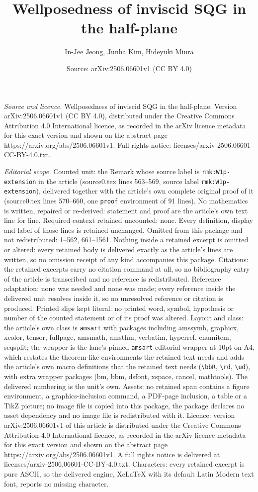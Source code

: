 \documentclass[10pt,a4paper]{amsart}
\title[Wellposedness of inviscid SQG in the half-plane]{Wellposedness of inviscid SQG in the half-plane}
\author{In-Jee Jeong, Junha Kim, Hideyuki Miura}
\date{Source: arXiv:2506.06601v1 (CC BY 4.0)}
\begin{document}
\maketitle

\noindent\emph{Source and licence.} Wellposedness of inviscid SQG in the half-plane. Version arXiv:2506.06601v1 (CC BY 4.0), distributed under the Creative Commons Attribution 4.0 International licence, as recorded in the arXiv licence metadata for this exact version and shown on the abstract page https://arxiv.org/abs/2506.06601v1. Full rights notice: licenses/arxiv-2506.06601-CC-BY-4.0.txt.\par\smallskip

\noindent\textit{Editorial scope.} Counted unit: the Remark whose source label is \texttt{rmk:W1p-extension} in the article (source0.tex lines 563--569, source label \texttt{rmk:W1p-extension}), delivered together with the article's own complete original proof of it (source0.tex lines 570--660, one \texttt{proof} environment of 91 lines). No mathematics is written, repaired or re-derived: statement and proof are the article's own text line for line. Required context retained uncounted: none. Every definition, display and label of those lines is retained unchanged. Omitted from this package and not redistributed: 1--562, 661--1561. Nothing inside a retained excerpt is omitted or altered: every retained body is delivered exactly as the article's lines are written, so no omission receipt of any kind accompanies this package. Citations: the retained excerpts carry no citation command at all, so no bibliography entry of the article is transcribed and no reference is redistributed. Reference adaptation: none was needed and none was made; every reference inside the delivered unit resolves inside it, so no unresolved reference or citation is produced. Printed slips kept literal: no printed word, symbol, hypothesis or number of the counted statement or of its proof was altered. Layout and class: the article's own class is \texttt{amsart} with packages including amssymb, graphicx, xcolor, tensor, fullpage, amsmath, amsthm, verbatim, hyperref, enumitem, seqsplit; the wrapper is the lane's pinned \texttt{amsart} editorial wrapper at 10pt on A4, which restates the theorem-like environments the retained text needs and adds the article's own macro definitions that the retained text needs (\texttt{\textbackslash bbR}, \texttt{\textbackslash rd}, \texttt{\textbackslash ud}), with extra wrapper packages (bm, bbm, dsfont, xspace, cancel, mathtools). The delivered numbering is the unit's own. Assets: no retained span contains a figure environment, a graphics-inclusion command, a PDF-page inclusion, a table or a TikZ picture; no image file is copied into this package, the package declares no asset dependency and no image file is redistributed with it. Licence: version arXiv:2506.06601v1 of this article is distributed under the Creative Commons Attribution 4.0 International licence, as recorded in the arXiv licence metadata for this exact version and shown on the abstract page https://arxiv.org/abs/2506.06601v1. A full rights notice is delivered at licenses/arxiv-2506.06601-CC-BY-4.0.txt. Characters: every retained excerpt is pure ASCII, so the delivered engine, XeLaTeX with its default Latin Modern text font, reports no missing character.
\end{document}
